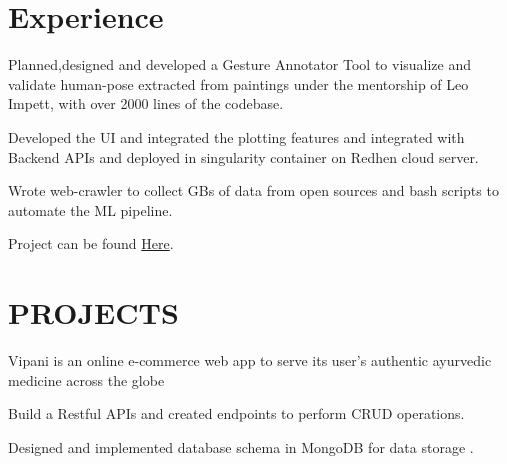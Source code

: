 \documentclass[]{deedy-resume-openfont}
\begin{document}
\hfill
\begin{minipage}[t]{0.66\textwidth} 


\section{Experience}

\vspace{\topsep} %
\begin{tightemize}\item Planned,designed and developed a Gesture Annotator Tool to visualize and
validate human-pose extracted from  paintings under the mentorship of Leo Impett, with over 2000 lines of the codebase.
\item Developed the UI and integrated the plotting features and integrated with Backend APIs and deployed in singularity container on Redhen cloud server.
\item Wrote web-crawler to collect GBs of data from open sources and bash scripts
to automate the ML pipeline.
\item Project can be found  \href{https://summerofcode.withgoogle.com/archive/2019/projects/5565179075493888/}{Here}.
\end{tightemize}
\sectionsep

\sectionsep


\section{PROJECTS}
Vipani is an online e-commerce web app to serve its user’s authentic ayurvedic
medicine across the globe
\begin{tightemize}
\item Build a Restful APIs and created endpoints to perform CRUD operations.
\item Designed and implemented database schema in MongoDB for data storage .
\end{tightemize}
\sectionsep


\end{minipage}
\end{document}
